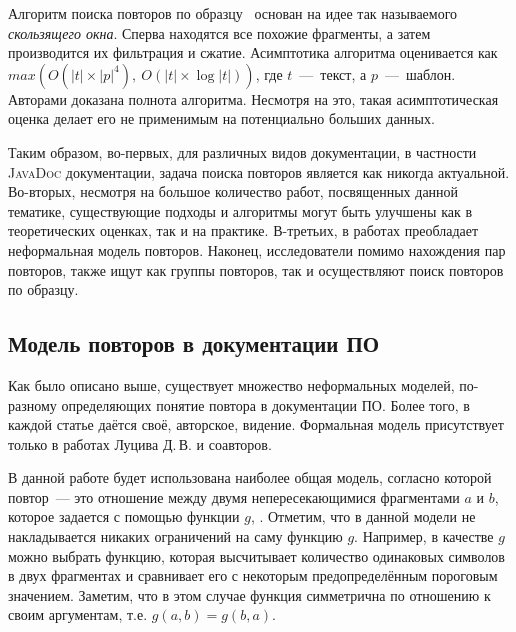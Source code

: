 Алгоритм поиска повторов по образцу~\cite{luciv2019interactive} основан на идее так называемого \emph{скользящего окна}.
Сперва находятся все похожие фрагменты, а затем производится их фильтрация и сжатие.
Асимптотика алгоритма оценивается как $max(O(|t|\times|p|^4),\ O(|t|\times \log |t|))$, где $t$~---~текст, а $p$~---~шаблон.
Авторами доказана полнота алгоритма.
Несмотря на это, такая асимптотическая оценка делает его не применимым на потенциально больших данных.

Таким образом, во-первых, для различных видов документации, в частности \textsc{JavaDoc} документации, задача поиска повторов является как никогда актуальной.
Во-вторых, несмотря на большое количество работ, посвященных  данной тематике, существующие подходы и алгоритмы могут быть улучшены как в теоретических оценках, так и на практике.
В-третьих, в работах преобладает неформальная модель повторов.
Наконец, исследователи помимо нахождения пар повторов, также ищут как группы повторов, так и осуществляют поиск повторов по образцу.


\subsection{Модель повторов в документации ПО}\label{Model}
Как было описано выше, существует множество неформальных моделей, по-разному определяющих понятие повтора в документации ПО.
Более того, в каждой статье даётся своё, авторское, видение.
Формальная  модель присутствует только в работах Луцива Д.\,В. и соавторов.

В данной работе будет использована наиболее общая модель, согласно которой повтор~--- это отношение между двумя непересекающимися фрагментами $a$ и $b$, которое задается с помощью функции  $g$, .
Отметим, что в данной модели не накладывается никаких ограничений на саму функцию $g$.
Например, в качестве $g$ можно выбрать функцию, которая высчитывает количество одинаковых символов в двух фрагментах и сравнивает его с некоторым предопределённым пороговым значением. %
Заметим, что в этом случае функция симметрична по отношению к своим аргументам, т.е. $g(a,b) = g(b,a)$.

